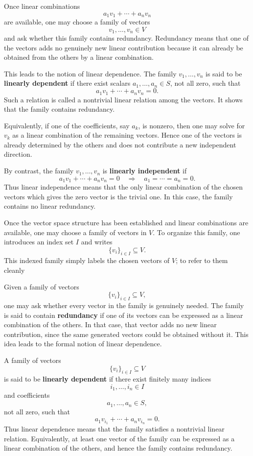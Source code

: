 \documentclass[12pt]{article}
\begin{document}
	Once linear combinations
	\[
	a_1v_1+\cdots+a_nv_n
	\]
	are available, one may choose a family of vectors
	\[
	v_1,\dots,v_n\in V
	\]
	and ask whether this family contains redundancy. Redundancy means that one of the vectors adds no genuinely new linear contribution because it can already be obtained from the others by a linear combination.
	
	This leads to the notion of linear dependence. The family $v_1,\dots,v_n$ is said to be \textbf{linearly dependent} if there exist scalars $a_1,\dots,a_n\in S$, not all zero, such that
	\[
	a_1v_1+\cdots+a_nv_n=0.
	\]
	Such a relation is called a nontrivial linear relation among the vectors. It shows that the family contains redundancy.
	
	Equivalently, if one of the coefficients, say $a_k$, is nonzero, then one may solve for $v_k$ as a linear combination of the remaining vectors. Hence one of the vectors is already determined by the others and does not contribute a new independent direction.
	
	By contrast, the family $v_1,\dots,v_n$ is \textbf{linearly independent} if
	\[
	a_1v_1+\cdots+a_nv_n=0
	\quad\Longrightarrow\quad
	a_1=\cdots=a_n=0.
	\]
	Thus linear independence means that the only linear combination of the chosen vectors which gives the zero vector is the trivial one. In this case, the family contains no linear redundancy.
	
	Once the vector space structure has been established and linear combinations are available, one may choose a family of vectors in \(V\). To organize this family, one introduces an index set \(I\) and writes
	\[
	\{v_i\}_{i\in I}\subseteq V.
	\]
	This indexed family simply labels the chosen vectors of \(V\); to refer to them cleanly 
	
	Given a family of vectors
	\[
	\{v_i\}_{i\in I}\subseteq V,
	\]
	one may ask whether every vector in the family is genuinely needed. The family is said to contain \textbf{redundancy} if one of its vectors can be expressed as a linear combination of the others. In that case, that vector adds no new linear contribution, since the same generated vectors could be obtained without it. This idea leads to the formal notion of linear dependence.
	
	A family of vectors
	\[
	\{v_i\}_{i\in I}\subseteq V
	\]
	is said to be \textbf{linearly dependent} if there exist finitely many indices
	\[
	i_1,\dots,i_n\in I
	\]
	and coefficients
	\[
	a_1,\dots,a_n\in S,
	\]
	not all zero, such that
	\[
	a_1v_{i_1}+\cdots+a_nv_{i_n}=0.
	\]
	Thus linear dependence means that the family satisfies a nontrivial linear relation. Equivalently, at least one vector of the family can be expressed as a linear combination of the others, and hence the family contains redundancy.
	
\end{document}
